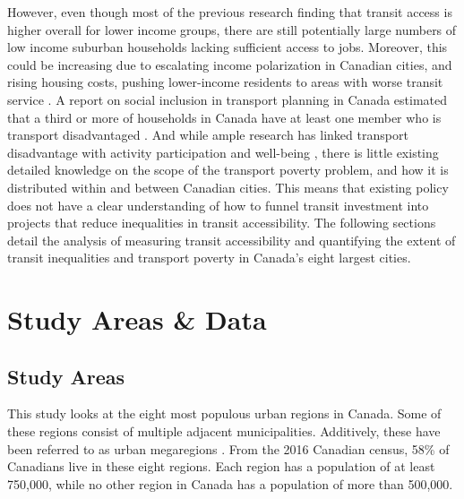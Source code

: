 \documentclass[11 pt, letterpaper]{article}
\begin{document}
{However, even though most of the previous research finding that transit access is higher overall for lower income groups, there are still potentially large numbers of low income suburban households lacking sufficient access to jobs. Moreover, this could be increasing due to escalating income polarization in Canadian cities, and rising housing costs, pushing lower-income residents to areas with worse transit service \cite{ades2012}. A report on social inclusion in transport planning in Canada estimated that a third or more of households in Canada have at least one member who is transport disadvantaged \cite{litman2003}. And while ample research has linked transport disadvantage with activity participation and well-being \cite{spinney2009,paez2009}, there is little existing detailed knowledge on the scope of the transport poverty problem, and how it is distributed within and between Canadian cities. This means that existing policy does not have a clear understanding of how to funnel transit investment into projects that reduce inequalities in transit accessibility. The following sections detail the analysis of measuring transit accessibility and quantifying the extent of transit inequalities and transport poverty in Canada's eight largest cities.



\newpage

\section{Study Areas \& Data}

\subsection{Study Areas}

This study looks at the eight most populous urban regions in Canada. Some of these regions consist of multiple adjacent municipalities. Additively, these have been referred to as urban megaregions \cite{simmons2013}. From the 2016 Canadian census, 58\% of Canadians live in these eight regions. Each region has a population of at least 750,000, while no other region in Canada has a population of more than 500,000.

}
\end{document}
